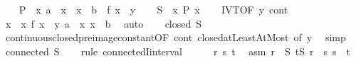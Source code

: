 \begin{isabellebody}
%
\isadelimproof
%
\endisadelimproof
%
\isatagproof
{}\isamarkupfalse%
{\isacharminus}{\kern0pt}\isanewline
\ \ \isamarkupfalse%
\ {\isacharquery}{\kern0pt}P\ {\isacharequal}{\kern0pt}\ {\isachardoublequoteopen}{\isasymlambda}x{\isachardot}{\kern0pt}\ a\ {\isasymle}\ x\ {\isasymand}\ x\ {\isasymle}\ b\ {\isasymand}\ f\ x\ {\isacharequal}{\kern0pt}\ y{\isachardoublequoteclose}\isanewline
\ \ \isamarkupfalse%
\ {\isacharquery}{\kern0pt}S\ {\isacharequal}{\kern0pt}\ {\isachardoublequoteopen}{\isacharbraceleft}{\kern0pt}x{\isachardot}{\kern0pt}\ {\isacharquery}{\kern0pt}P\ x{\isacharbraceright}{\kern0pt}{\isachardoublequoteclose}\isanewline
\ \ \isamarkupfalse%
\ IVT{\isacharprime}{\kern0pt}{\isacharbrackleft}{\kern0pt}OF\ y\ cont{\isacharbrackright}{\kern0pt}\ \isamarkupfalse%
\ x\ \ x{\isacharcolon}{\kern0pt}\ {\isachardoublequoteopen}f\ x\ {\isacharequal}{\kern0pt}\ y{\isachardoublequoteclose}\ {\isachardoublequoteopen}a\ {\isasymle}\ x{\isachardoublequoteclose}\ {\isachardoublequoteopen}x\ {\isasymle}\ b{\isachardoublequoteclose}\ \isamarkupfalse%
\ auto\isanewline
\ \ \isamarkupfalse%
\ {\isachardoublequoteopen}closed\ {\isacharquery}{\kern0pt}S{\isachardoublequoteclose}\isanewline
\ \ \ \ \isamarkupfalse%
\ continuous{\isacharunderscore}{\kern0pt}closed{\isacharunderscore}{\kern0pt}preimage{\isacharunderscore}{\kern0pt}constant{\isacharbrackleft}{\kern0pt}OF\ cont\ closed{\isacharunderscore}{\kern0pt}atLeastAtMost{\isacharcomma}{\kern0pt}\ of\ y{\isacharbrackright}{\kern0pt}\ \isamarkupfalse%
\ simp\isanewline
\ \ \isamarkupfalse%
\ {\isachardoublequoteopen}connected\ {\isacharquery}{\kern0pt}S{\isachardoublequoteclose}\isanewline
\isanewline
\ \ \isamarkupfalse%
\ {\isacharparenleft}{\kern0pt}rule\ connectedI{\isacharunderscore}{\kern0pt}interval{\isacharparenright}{\kern0pt}\isanewline
\ \ \ \ \isamarkupfalse%
\ r\ s\ t\ \isamarkupfalse%
\ asm{\isacharcolon}{\kern0pt}\ {\isachardoublequoteopen}r\ {\isasymin}\ {\isacharquery}{\kern0pt}S{\isachardoublequoteclose}\ {\isachardoublequoteopen}t{\isasymin}{\isacharquery}{\kern0pt}S{\isachardoublequoteclose}\ {\isachardoublequoteopen}r\ {\isasymle}\ s{\isachardoublequoteclose}\ {\isachardoublequoteopen}s\ {\isasymle}\ t{\isachardoublequoteclose}\isanewline
\ \ \ \ \isamarkupfalse%
\ \isamarkupfalse%

\end{isabellebody}
